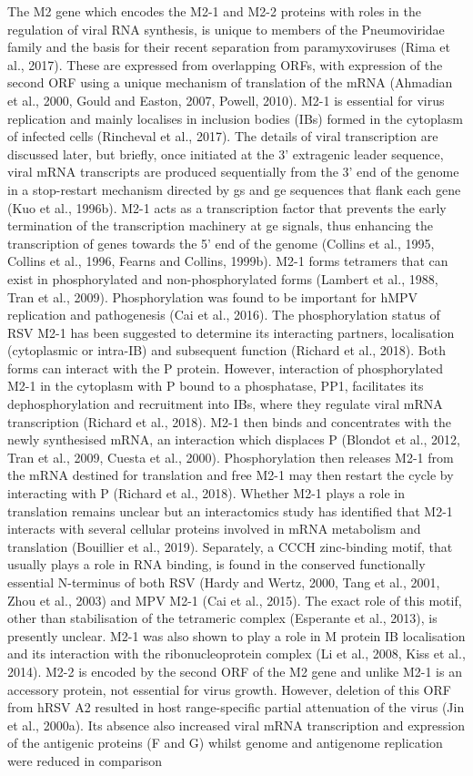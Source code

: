 The M2 gene which encodes the M2-1 and M2-2 proteins with roles in the regulation of viral RNA synthesis, is unique to members of the Pneumoviridae family and the basis for their recent separation from paramyxoviruses (Rima et al., 2017). These are expressed from overlapping ORFs, with expression of the second ORF using a unique mechanism of translation of the mRNA (Ahmadian et al., 2000, Gould and Easton, 2007, Powell, 2010). M2-1 is essential for virus replication and mainly localises in inclusion bodies (IBs) formed in the cytoplasm of infected cells (Rincheval et al., 2017). The details of viral transcription are discussed later, but briefly, once initiated at the 3' extragenic leader sequence, viral mRNA transcripts are produced sequentially from the 3' end of the genome in a stop-restart mechanism directed by gs and ge sequences that flank each gene (Kuo et al., 1996b). M2-1 acts as a transcription factor that prevents the early termination of the transcription machinery at ge signals, thus enhancing the transcription of genes towards the 5' end of the genome (Collins et al., 1995, Collins et al., 1996, Fearns and Collins, 1999b). M2-1 forms tetramers that can exist in phosphorylated and non-phosphorylated forms (Lambert et al., 1988, Tran et al., 2009). Phosphorylation was found to be important for hMPV replication and pathogenesis (Cai et al., 2016). The phosphorylation status of RSV M2-1 has been suggested to determine its interacting partners, localisation (cytoplasmic or intra-IB) and subsequent function (Richard et al., 2018). Both forms can interact with the P protein. However, interaction of phosphorylated M2-1 in the cytoplasm with P bound to a phosphatase, PP1, facilitates its dephosphorylation and recruitment into IBs, where they regulate viral mRNA transcription (Richard et al., 2018). M2-1 then binds and concentrates with the newly synthesised mRNA, an interaction which displaces P (Blondot et al., 2012, Tran et al., 2009, Cuesta et al., 2000). Phosphorylation then releases M2-1 from the mRNA destined for translation and free M2-1 may then restart the cycle by interacting with P (Richard et al., 2018). Whether M2-1 plays a role in translation remains unclear but an interactomics study has identified that M2-1 interacts with several cellular proteins involved in mRNA metabolism and translation (Bouillier et al., 2019). Separately, a CCCH zinc-binding motif, that usually plays a role in RNA binding, is found in the conserved functionally essential N-terminus of both RSV (Hardy and Wertz, 2000, Tang et al., 2001, Zhou et al., 2003) and MPV M2-1 (Cai et al., 2015). The exact role of this motif, other than stabilisation of the tetrameric complex (Esperante et al., 2013), is presently unclear. M2-1 was also shown to play a role in M protein IB localisation and its interaction with the ribonucleoprotein complex (Li et al., 2008, Kiss et al., 2014). M2-2 is encoded by the second ORF of the M2 gene and unlike M2-1 is an accessory protein, not essential for virus growth. However, deletion of this ORF from hRSV A2 resulted in host range-specific partial attenuation of the virus (Jin et al., 2000a). Its absence also increased viral mRNA transcription and expression of the antigenic proteins (F and G) whilst genome and antigenome replication were reduced in comparison 